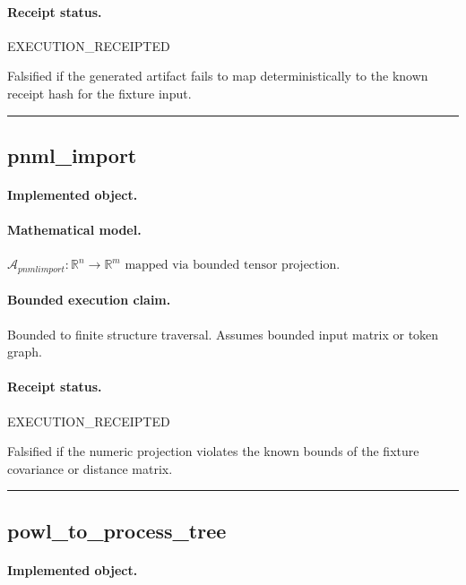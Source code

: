 \paragraph{Receipt status.} EXECUTION\_RECEIPTED
\begin{falsifier}
Falsified if the generated artifact fails to map deterministically to the known receipt hash for the fixture input.
\end{falsifier}

\vspace{1em}\hrule\vspace{1em}
\subsection{pnml\_import}
\paragraph{Implemented object.} 
\paragraph{Mathematical model.} $\mathcal{A}_{pnmlimport} : \mathbb{R}^{n} \to \mathbb{R}^{m} \text{ mapped via bounded tensor projection}.$
\paragraph{Bounded execution claim.} Bounded to finite structure traversal. Assumes bounded input matrix or token graph.
\paragraph{Receipt status.} EXECUTION\_RECEIPTED
\begin{falsifier}
Falsified if the numeric projection violates the known bounds of the fixture covariance or distance matrix.
\end{falsifier}

\vspace{1em}\hrule\vspace{1em}
\subsection{powl\_to\_process\_tree}
\paragraph{Implemented object.} 
